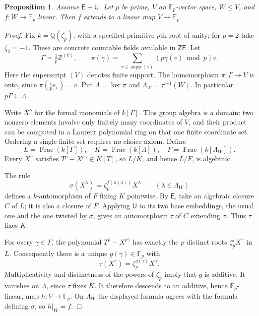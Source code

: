 \documentclass[11pt,a4paper]{article}
\newtheorem{proposition}[theorem]{Proposition}
\theoremstyle{definition}\newtheorem{definition}[theorem]{Definition}
\theoremstyle{remark}\newtheorem{remark}[theorem]{Remark}
\newcommand{\ZF}{\mathsf{ZF}}\newcommand{\ZFA}{\mathsf{ZFA}}
\newcommand{\E}{\mathsf E}\newcommand{\U}{\mathsf U}
\newcommand{\Q}{\mathbb Q}\newcommand{\F}{\mathbb F}
\begin{document}
\begin{proposition}\label{prop:kummer-linear}
Assume $\E+\U$.  Let $p$ be prime, $V$ an $\F_p$-vector space, $W\leq V$,
and $f:W\to\F_p$ linear.  Then $f$ extends to a linear map $V\to\F_p$.
\end{proposition}
\begin{proof}
Fix $k=\Q(\zeta_p)$, with a specified primitive $p$th root of unity; for
$p=2$ take $\zeta_2=-1$.  These are concrete countable fields available in
$\ZF$.  Let
\[
 \Gamma=\tfrac1p\mathbb Z^{(V)},\qquad
 \pi(\gamma)=\sum_{v\in\operatorname{supp}(\gamma)}
                  (p\gamma(v)\bmod p)v.
\]
Here the superscript $(V)$ denotes finite support.  The homomorphism
$\pi:\Gamma\to V$ is onto, since $\pi(\tfrac1p e_v)=v$.
Put $\Lambda=\ker\pi$ and $\Lambda_W=\pi^{-1}(W)$.
In particular $p\Gamma\subseteq\Lambda$.

Write $X^\gamma$ for the formal monomials of $k[\Gamma]$.
This group algebra is a domain: two nonzero elements involve only finitely
many coordinates of $V$, and their product can be computed in a Laurent
polynomial ring on that one finite coordinate set.  Ordering a single
finite set requires no choice axiom.  Define
\[
 L=\operatorname{Frac}(k[\Gamma]),\quad
 K=\operatorname{Frac}(k[\Lambda]),\quad
 F=\operatorname{Frac}(k[\Lambda_W]).
\]
Every $X^\gamma$ satisfies
$T^p-X^{p\gamma}\in K[T]$, so $L/K$, and hence $L/F$, is algebraic.

The rule
\[
 \sigma(X^\lambda)=\zeta_p^{f(\pi(\lambda))}X^\lambda
 \qquad(\lambda\in\Lambda_W)
\]
defines a $k$-automorphism of $F$ fixing $K$ pointwise.
By $\E$, take an algebraic closure $C$ of $L$; it is also a closure of $F$.
Applying $\U$ to its two base embeddings, the usual one and the one twisted
by $\sigma$, gives an automorphism $\tau$ of $C$ extending $\sigma$.
Thus $\tau$ fixes $K$.

For every $\gamma\in\Gamma$, the polynomial $T^p-X^{p\gamma}$ has
exactly the $p$ distinct roots $\zeta_p^jX^\gamma$ in $L$.
Consequently there is a unique $g(\gamma)\in\F_p$ with
\[
       \tau(X^\gamma)=\zeta_p^{g(\gamma)}X^\gamma.
\]
Multiplicativity and distinctness of the powers of $\zeta_p$ imply that
$g$ is additive.  It vanishes on $\Lambda$, since $\tau$ fixes $K$.
It therefore descends to an additive, hence $\F_p$-linear, map
$h:V\to\F_p$.  On $\Lambda_W$ the displayed formula agrees with the
formula defining $\sigma$, so $h|_W=f$.
\end{proof}
\end{document}
